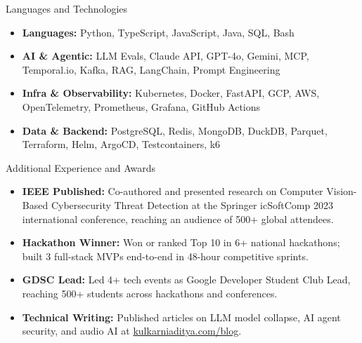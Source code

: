 \documentclass[]{mcdowellcv}
\begin{document}
\begin{cvsection}{Languages and Technologies}
  \begin{cvsubsection}{}{}{}
    \begin{itemize}
      \item \textbf{Languages:} Python, TypeScript, JavaScript, Java, SQL, Bash
      \item \textbf{AI \& Agentic:} LLM Evals, Claude API, GPT-4o, Gemini, MCP, Temporal.io, Kafka, RAG, LangChain, Prompt Engineering
      \item \textbf{Infra \& Observability:} Kubernetes, Docker, FastAPI, GCP, AWS, OpenTelemetry, Prometheus, Grafana, GitHub Actions
      \item \textbf{Data \& Backend:} PostgreSQL, Redis, MongoDB, DuckDB, Parquet, Terraform, Helm, ArgoCD, Testcontainers, k6
    \end{itemize}
  \end{cvsubsection}
\end{cvsection}

\begin{cvsection}{Additional Experience and Awards}
  \begin{cvsubsection}{}{}{}
    \begin{itemize}
      \item \textbf{IEEE Published:} Co-authored and presented research on Computer Vision-Based Cybersecurity Threat Detection at the Springer icSoftComp 2023 international conference, reaching an audience of 500+ global attendees.
      \item \textbf{Hackathon Winner:} Won or ranked Top 10 in 6+ national hackathons; built 3 full-stack MVPs end-to-end in 48-hour competitive sprints.
      \item \textbf{GDSC Lead:} Led 4+ tech events as Google Developer Student Club Lead, reaching 500+ students across hackathons and conferences.
      \item \textbf{Technical Writing:} Published articles on LLM model collapse, AI agent security, and audio AI at \href{https://www.kulkarniaditya.com/blog}{kulkarniaditya.com/blog}.
    \end{itemize}
  \end{cvsubsection}
\end{cvsection}
\end{document}
